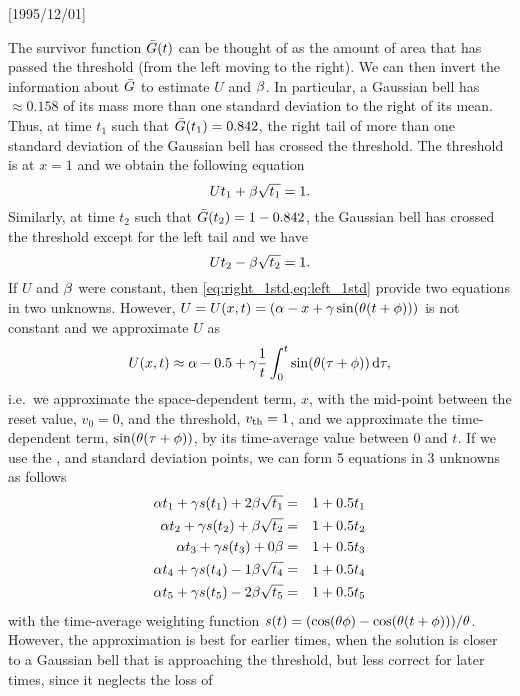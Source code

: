 \NeedsTeXFormat{LaTeX2e}[1995/12/01] \documentclass[10pt]{bmc_article}
\newenvironment{bmcformat}{\begin{raggedright}\baselineskip20pt\sloppy\setboolean{publ}{false}}{\end{raggedright}\baselineskip20pt\sloppy}
\begin{document}
\begin{bmcformat}
The survivor function ${ \bar{G} }(t)$ can be thought of as the amount of area that has
passed the threshold (from the left moving to the right). We can then invert the
information about ${ \bar{G} }$ to estimate $U$ and ${\beta}$. In particular, a Gaussian bell
has $\approx 0.158$ of its mass more than one standard deviation to the right of
its mean. Thus, at time $t_1$ such that ${ \bar{G} }(t_1) = 0.842$, the right tail of
more than one standard deviation of the Gaussian bell has crossed the threshold.
The threshold is at $x = 1$ and we obtain the following equation
\begin{equation}
U t_1 + {\beta} \sqrt{t_1} = 1.
\label{eq:right_1std}
\end{equation}
Similarly, at time $t_2$ such that ${ \bar{G} }(t_2) = 1 - 0.842$, the Gaussian bell has
crossed the threshold except for the left tail and we have
\begin{equation}
U t_2 - {\beta} \sqrt{t_2} = 1.
\label{eq:left_1std}
\end{equation}
If $U$ and ${\beta}$ were constant, then \cref{eq:right_1std,eq:left_1std} provide
two equations in two unknowns.
However, $U = U(x,t) = ({\alpha} - x + {\gamma } \sin({\theta} (t + \phi)) )$ is not constant and
we approximate $U$ as
\begin{equation}
U(x,t ) \approx {\alpha} -0.5 + {\gamma } \frac{1}{t}\int_0^t \sin({\theta} ({\tau}+\phi)) \, \mathrm{d} {\tau}, 
\end{equation}
i.e.\ we approximate the space-dependent term, $x$, with the mid-point between
the reset value, $v_0 = 0$, and the threshold, ${ v_{\textrm{th} } } = 1$, and we approximate
the time-dependent term, $\sin({\theta} ({\tau}+\phi))$, by its time-average value
between $0$ and $t$. If we use the ,  and  standard 
deviation points, we can form 5 equations in 3 unknowns as follows
\begin{eqnarray*}
{\alpha} t_1 + {\gamma } s(t_1) + 2{\beta} \sqrt{t_1}
&=& 1 + 0.5 t_1
\\
{\alpha} t_2 + {\gamma } s(t_2) + {\beta} \sqrt{t_2}
&=& 1 + 0.5 t_2 
\\
{\alpha} t_3 + {\gamma } s(t_3) + 0{\beta}
&=& 1 + 0.5 t_3
\\
{\alpha} t_4 + {\gamma } s(t_4)-1 {\beta} \sqrt{t_4}
&=& 1 + 0.5 t_4 
\\
{\alpha} t_5 + {\gamma } s(t_5) - 2{\beta} \sqrt{t_5}
&=& 1 + 0.5 t_5 
\end{eqnarray*}
with the time-average weighting function $s(t) = (\cos({\theta} \phi)
-\cos({\theta}(t+\phi)))/{{\theta}} $. However, the  approximation is best for earlier
times, when the solution is closer to a Gaussian bell that is approaching the
threshold, but less correct for later times, since it neglects the loss of

\end{bmcformat}
\end{document}
